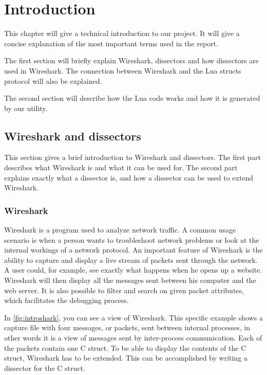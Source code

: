 \chapter*{Introduction}

This chapter will give a technical introduction to our project.
It will give a concise explanation of the most important terms used in the report.

The first section will briefly explain Wireshark, dissectors and how dissectors are used in Wireshark.
The connection between Wireshark and the Lua structs protocol will also be explained.

The second section will describe how the Lua code works and how it is generated by our utility.

\section*{Wireshark and dissectors}
This section gives a brief introduction to Wireshark and dissectors.
The first part describes what Wireshark is and what it can be used for.
The second part explains exactly what a dissector is, and how a dissector can be used to extend Wireshark.

\subsection*{Wireshark}
Wireshark is a program used to analyze network traffic. A common usage scenario is when a person wants to troubleshoot network problems or
look at the internal workings of a network protocol. An important feature of Wireshark is the ability to capture and display a live stream of packets sent through the network. 
A user could, for example, see exactly what happens when he opens up a website. Wireshark will then display all the messages
sent between his computer and the web server. It is also possible to filter and search on given packet attributes, which facilitates the debugging process.

In \autoref{fig:introshark}, you can see a view of Wireshark.
This specific example shows a capture file with four messages, or packets, sent between internal processes, in other words
it is a view of messages sent by inter-process communication. Each of the packets contain one C struct.
To be able to display the contents of the C struct, Wireshark has to be extended. 
This can be accomplished by writing a dissector for the C struct.

